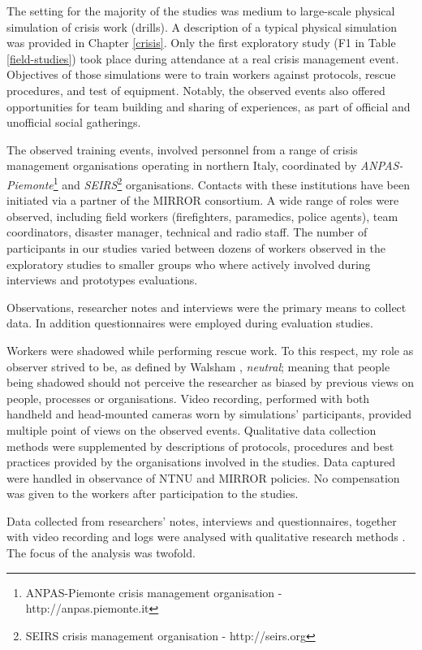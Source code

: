 The setting for the majority of the studies was medium to large-scale physical simulation of crisis work (drills). A description of a typical physical simulation was provided in Chapter \ref{crisis}. Only the first exploratory study (F1 in Table \ref{field-studies}) took place during attendance at a real crisis management event. Objectives of those simulations were to train workers against protocols, rescue procedures, and test of equipment. Notably, the observed events also offered opportunities for team building and sharing of experiences, as part of official and unofficial social gatherings.

The observed training events, involved personnel from a range of crisis management organisations operating in northern Italy, coordinated by \emph{ANPAS-Piemonte}\footnote{ANPAS-Piemonte crisis management organisation - http://anpas.piemonte.it} and \emph{SEIRS}\footnote{SEIRS crisis management organisation - http://seirs.org} organisations. Contacts with these institutions have been initiated via a partner of the MIRROR consortium. A wide range of roles were observed, including field workers (firefighters, paramedics, police agents), team coordinators, disaster manager, technical and radio staff. The number of participants in our studies varied between dozens of workers observed in the exploratory studies to smaller groups who where actively involved during interviews and prototypes evaluations.

Observations, researcher notes and interviews were the primary means to collect data. In addition questionnaires were employed during evaluation studies.

Workers were shadowed while performing rescue work. To this respect, my role as observer strived to be, as defined by Walsham \autocite*{Walsham:2006bo}, \emph{neutral}; meaning that people being shadowed should not perceive the researcher as biased by previous views on people, processes or organisations. Video recording, performed with both handheld and head-mounted cameras worn by simulations' participants, provided multiple point of views on the observed events. Qualitative data collection methods were supplemented by descriptions of protocols, procedures and best practices provided by the organisations involved in the studies. Data captured were handled in observance of NTNU and MIRROR policies. No compensation was given to the workers after participation to the studies.

Data collected from researchers' notes, interviews and questionnaires, together with video recording and logs were analysed with qualitative research methods \autocite{robson1993real}. The focus of the analysis was twofold.


